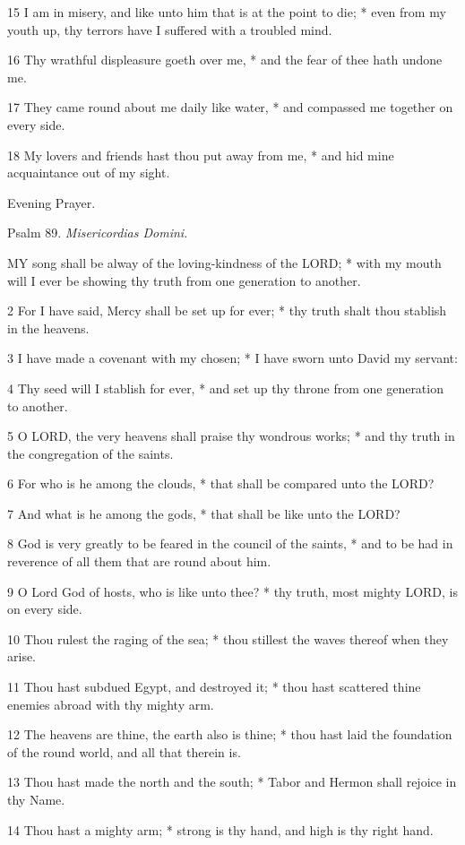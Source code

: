 15 I am in misery, and like unto him that is at the
point to die; * even from my youth up, thy terrors have I suffered with
a troubled mind.

16 Thy wrathful displeasure goeth over me, * and the
fear of thee hath undone me.

17 They came round about me daily like water, * and
compassed me together on every side.

18 My lovers and friends hast thou put away from me,
* and hid mine acquaintance out of my sight. 

Evening
Prayer.

Psalm
89. \emph{Misericordias Domini.}

MY
song shall be alway of the loving-kindness of the LORD; * with my mouth
will I ever be showing thy truth from one generation to another.

2 For I have said, Mercy shall be set up for ever;
* thy truth shalt thou stablish in the heavens.

3 I have made a covenant with my chosen; * I have sworn
unto David my servant:

4 Thy seed will I stablish for ever, * and set up thy
throne from one generation to another.

5 O LORD, the very heavens shall praise thy wondrous
works; * and thy truth in the congregation of the saints.

6 For who is he among the clouds, * that shall be compared
unto the LORD?

7 And what is he among the gods, * that shall be like
unto the LORD?

8 God is very greatly to be feared in the council of
the saints, * and to be had in reverence of all them that are round about
him.

9 O Lord God of hosts, who is like unto thee? * thy
truth, most mighty LORD, is on every side.

10 Thou rulest the raging of the sea; * thou stillest
the waves thereof when they arise.

11 Thou hast subdued Egypt, and destroyed it; * thou
hast scattered thine enemies abroad with thy mighty arm.

12 The heavens are thine, the earth also is thine;
* thou hast laid the foundation of the round world, and all that therein
is.

13 Thou hast made the north and the south; * Tabor
and Hermon shall rejoice in thy Name.

14 Thou hast a mighty arm; * strong is thy hand, and
high is thy right hand.

